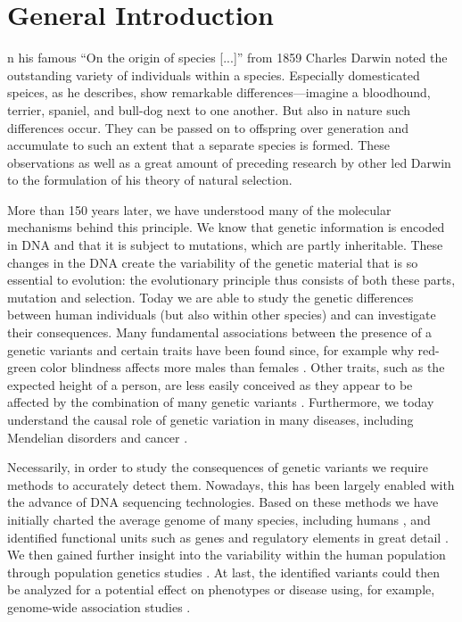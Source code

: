 \chapter{General Introduction}
\label{sec:intro}

n his famous ``On the origin of species [...]'' from 1859 Charles Darwin noted
the outstanding variety of individuals within a species. Especially domesticated
speices, as he describes, show remarkable differences---imagine a bloodhound,
terrier, spaniel, and bull-dog next to one another. But also in nature such
differences occur. They can be passed on to offspring over generation and
accumulate to such an extent that a separate species is formed. These
observations as well as a great amount of preceding research by other led
Darwin to the formulation of his theory of natural selection.

More than 150 years later, we have understood many of the molecular mechanisms
behind this principle. We know that genetic information is encoded in DNA and
that it is subject to mutations, which are partly inheritable. These changes in
the DNA create the variability of the genetic material that is so essential to
evolution: the evolutionary principle thus consists of both these parts,
mutation and selection. Today we are able to study the genetic differences
between human individuals (but also within other species) and can investigate
their consequences. Many fundamental associations between the presence of a
genetic variants and certain traits have been found since, for example why
red-green color blindness affects more males than females \citep{Nathans1986}.
Other traits, such as the expected height of a person, are less easily conceived
as they appear to be affected by the combination of many genetic variants
\citep{Wood2014,Marouli2017}. Furthermore, we today understand the causal role
of genetic variation in many diseases, including Mendelian disorders and cancer
\citep{Stankiewicz2010}.

Necessarily, in order to study the consequences of genetic variants we require
methods to accurately detect them. Nowadays, this has been largely enabled with
the advance of DNA sequencing technologies. Based on these methods we have
initially charted the average genome of many species, including humans
\citep{Lander2001,Venter2001}, and identified functional units such as genes and
regulatory elements in great detail \citep{Dunham2012}. We then gained further
insight into the variability within the human population through population
genetics studies \citep{Auton2015,Sudmant2015}. At last, the identified variants
could then be analyzed for a potential effect on phenotypes or disease using,
for example, genome-wide association studies \citep{Ott2015,MacArthur2017}.

